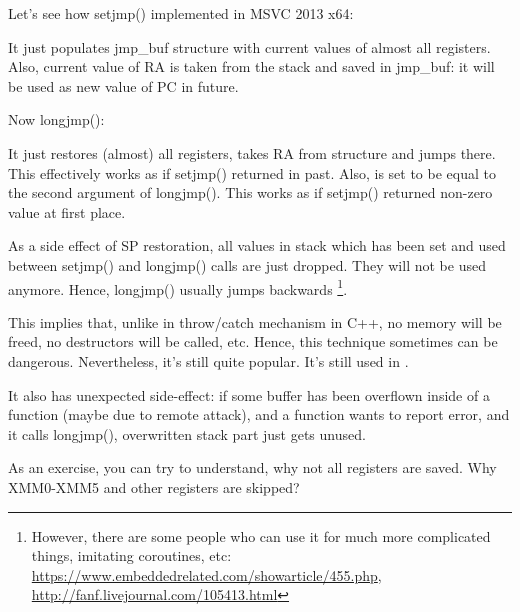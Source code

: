 Let's see how setjmp() implemented in MSVC 2013 x64:



It just populates jmp\_buf structure with current values of almost all registers.
Also, current value of \ac{RA} is taken from the stack and saved in jmp\_buf:
it will be used as new value of \ac{PC} in future.

Now longjmp():



It just restores (almost) all registers, takes \ac{RA} from structure and jumps there.
This effectively works as if setjmp() returned in past.
Also,  is set to be equal to the second argument of longjmp().
This works as if setjmp() returned non-zero value at first place.

As a side effect of \ac{SP} restoration, all values in stack which has been set and used between setjmp() and longjmp()
calls are just dropped.
They will not be used anymore.
Hence, longjmp() usually jumps backwards
\footnote{However, there are some people who can use it for much more complicated things,
imitating coroutines, etc: \url{https://www.embeddedrelated.com/showarticle/455.php},
\url{http://fanf.livejournal.com/105413.html}}.

This implies that, unlike in throw/catch mechanism in C++, no memory will be freed, no destructors will be called, etc.
Hence, this technique sometimes can be dangerous.
Nevertheless, it's still quite popular. It's still used in \oracle.

It also has unexpected side-effect: if some buffer has been overflown inside of a function (maybe due to remote attack),
and a function wants to report error, and it calls longjmp(), overwritten stack part just gets unused.

As an exercise, you can try to understand, why not all registers are saved.
Why XMM0-XMM5 and other registers are skipped?

